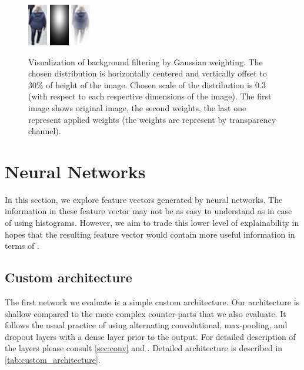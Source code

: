 \begin{figure}
    \centering
    \includegraphics{img/background_filter/1_original.png} \hspace{1cm} \includegraphics{img/background_filter/weights.png} \hspace{1cm}
    \includegraphics{img/background_filter/weights_applied.png}
    \caption[Visualization of background filtering by Gaussian weighting]{Visualization of background filtering by Gaussian weighting. The chosen distribution is horizontally centered and vertically offset to 30\% of height of the image. Chosen scale of the distribution is 0.3 (with respect to each respective dimensions of the image). The first image shows original image, the second weights, the last one represent applied weights (the weights are represent by transparency channel).}
    \label{fig:gaussian_weighting}
\end{figure}


\section{Neural Networks}



In this section, we explore feature vectors generated by neural networks. The information in these feature vector may not be as easy to understand as in case of using histograms. However, we aim to trade this lower level of explainability in hopes that the resulting feature vector would contain more useful information in terms of \reid{}.


\subsection{Custom architecture}

The first network we evaluate is a simple custom architecture. Our architecture is shallow compared to the more complex counter-parts that we also evaluate. It follows the usual practice of using alternating convolutional, max-pooling, and dropout layers with a dense layer prior to the output. For detailed description of the layers please consult \autoref{sec:conv} and \cite{deeplearningbook}. Detailed architecture is described in \autoref{tab:custom_architecture}.

